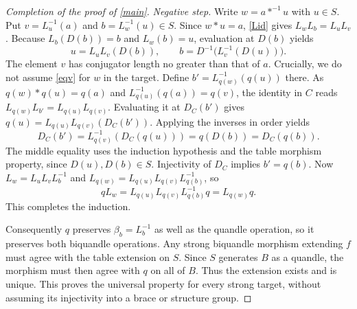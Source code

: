 \documentclass[11pt,a4paper]{article}
\begin{document}
\begin{proof}[Completion of the proof of \cref{main}]
\emph{Negative step.} Write $w=a*^{-1}u$ with $u\in S$. Put $v=L_u^{-1}(a)$ and $b=L_w^{-1}(u)\in S$. Since $w*u=a$, \eqref{Lid} gives $L_wL_b=L_uL_v$. Because $L_b(D(b))=b$ and $L_w(b)=u$, evaluation at $D(b)$ yields
\[
u=L_uL_v(D(b)),\qquad b=D^{-1}\bigl(L_v^{-1}(D(u))\bigr).
\]
The element $v$ has conjugator length no greater than that of $a$. Crucially, we do not assume \eqref{eqv} for $w$ in the target. Define $b'=L_{q(w)}^{-1}(q(u))$ there. As $q(w)*q(u)=q(a)$ and $L_{q(u)}^{-1}(q(a))=q(v)$, the identity in $C$ reads $L_{q(w)}L_{b'}=L_{q(u)}L_{q(v)}$. Evaluating it at $D_C(b')$ gives $q(u)=L_{q(u)}L_{q(v)}(D_C(b'))$. Applying the inverses in order yields
\[
D_C(b')=L_{q(v)}^{-1}(D_C(q(u)))=q(D(b))=D_C(q(b)).
\]
The middle equality uses the induction hypothesis and the table morphism property, since $D(u),D(b)\in S$. Injectivity of $D_C$ implies $b'=q(b)$. Now $L_w=L_uL_vL_b^{-1}$ and $L_{q(w)}=L_{q(u)}L_{q(v)}L_{q(b)}^{-1}$, so
\[
qL_w=L_{q(u)}L_{q(v)}L_{q(b)}^{-1}q=L_{q(w)}q.
\]
This completes the induction.

Consequently $q$ preserves $\beta_b=L_b^{-1}$ as well as the quandle operation, so it preserves both biquandle operations. Any strong biquandle morphism extending $f$ must agree with the table extension on $S$. Since $S$ generates $B$ as a quandle, the morphism must then agree with $q$ on all of $B$. Thus the extension exists and is unique. This proves the universal property for every strong target, without assuming its injectivity into a brace or structure group.
\end{proof}
\end{document}
